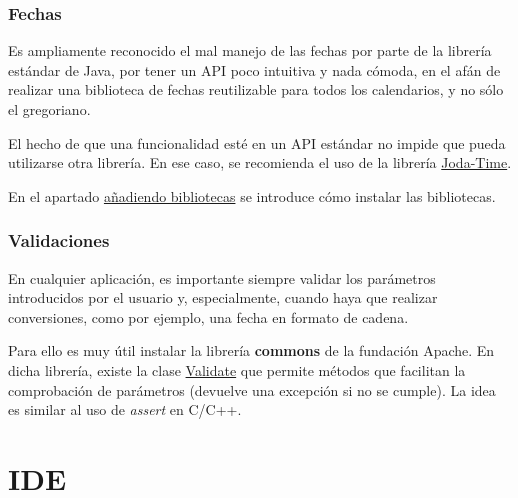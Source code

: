 \documentclass[11pt]{article}
\begin{document}
\subsubsection{Fechas}
\label{sec-2-2-2}

Es ampliamente reconocido el mal manejo de las fechas por parte de la librería estándar de Java, por tener un API poco intuitiva y nada cómoda, en el afán de realizar una biblioteca de fechas reutilizable para todos los calendarios, y no sólo el gregoriano.

El hecho de que una funcionalidad esté en un API estándar no impide que pueda utilizarse otra librería. En ese caso, se recomienda el uso de la librería \href{http://joda-time.sourceforge.net/}{Joda-Time}.

En el apartado \hyperref[sec-5]{añadiendo bibliotecas} se introduce cómo instalar las bibliotecas.

\subsubsection{Validaciones}
\label{sec-2-2-3}

En cualquier aplicación, es importante siempre validar los parámetros introducidos por el usuario y, especialmente, cuando haya que realizar conversiones, como por ejemplo, una fecha en formato de cadena.

Para ello es muy útil instalar la librería \textbf{commons} de la fundación Apache. En dicha librería, existe la clase \href{http://commons.apache.org/lang/api-2.5/org/apache/commons/lang/Validate.html}{Validate} que permite métodos que facilitan la comprobación de parámetros
(devuelve una excepción si no se cumple). La idea es similar al uso de \emph{assert} en C/C++.


%


\section{IDE}
\label{sec-3}
\label{ide}
\end{document}
